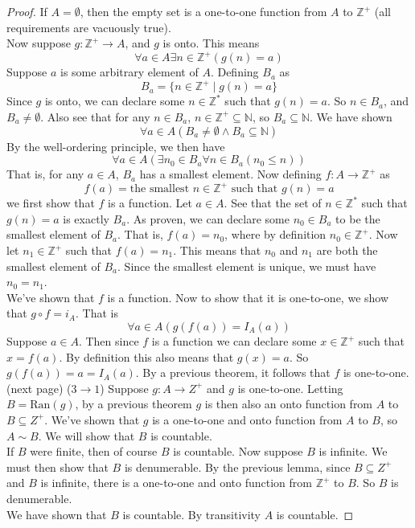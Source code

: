 \documentclass{report}
\theoremstyle{definition}
\begin{document}
\begin{proof}
If $A=\emptyset$, then the empty set is a one-to-one function from $A$ to $\mathbb Z^+$ (all requirements are vacuously true).\\
\indent Now suppose $g:\mathbb Z^+\to A$, and $g$ is onto. This means
\begin{equation*}
\forall a\in A\exists n\in\mathbb Z^+(g(n)=a)
\end{equation*}
Suppose $a$ is some arbitrary element of $A$. Defining $B_a$ as
\begin{equation*}
B_a=\{n\in\mathbb Z^+\mid g(n)=a\}
\end{equation*}
Since $g$ is onto, we can declare some $n\in\mathbb Z^*$ such that $g(n)=a$. So $n\in B_a$, and $B_a\neq\emptyset$. Also see 
that for any $n\in B_a$, $n\in\mathbb Z^+\subseteq\mathbb N$, so
$B_a\subseteq\mathbb N$. We have shown
\begin{equation*}
\forall a\in A(B_a\neq\emptyset\land B_a\subseteq\mathbb N)
\end{equation*}
By the well-ordering principle, we then have
\begin{equation*}
\forall a\in A(\exists n_0\in B_a\forall n\in B_a(n_0\leq n))
\end{equation*}
That is, for any $a\in A$, $B_a$ has a smallest element. Now defining $f:A\to\mathbb Z^+$ as
\begin{equation*}
f(a)=\text{the smallest }n\in\mathbb Z^+\text{ such that }g(n)=a
\end{equation*}
we first show that $f$ is a function. Let $a\in A$. See that the set of $n\in\mathbb Z^*$ such that $g(n)=a$ is exactly $B_a$.
As proven, we can declare some $n_0\in B_a$ to be the smallest element of $B_a$. That is, $f(a)=n_0$, where by definition $n_0\in\mathbb Z^+$. 
Now let $n_1\in\mathbb Z^+$ such that $f(a)=n_1$.
This means that $n_0$ and $n_1$ are both the smallest element of
$B_a$. Since the smallest element is unique, we must have $n_0=n_1$.\\
\indent We've shown that $f$ is a function. Now to show that it is one-to-one, we show that $g\circ f=i_A$. That is
\begin{equation*}
\forall a\in A(g(f(a))=I_A(a))
\end{equation*}
Suppose $a\in A$. Then since $f$ is a function we can declare some $x\in\mathbb Z^+$ such that $x=f(a)$. By definition this also
means that $g(x)=a$. So $g(f(a))=a=I_A(a)$.
By a previous theorem, it follows that $f$ is one-to-one.\\
(next page)\newpage
\noindent($3\rightarrow1$)
Suppose $g:A\to Z^+$ and $g$ is one-to-one. Letting $B=\text{Ran}(g)$, by a previous theorem $g$ is then also an onto function 
from $A$ to $B\subseteq Z^+$. We've shown that $g$ is a one-to-one and onto function from $A$ to $B$, so $A\sim B$. We will
show that $B$ is countable.\\
\indent If $B$ were finite, then of course $B$ is countable. Now suppose $B$ is infinite. We must then show that $B$ is denumerable. 
By the previous lemma, since $B\subseteq Z^+$ and $B$ is infinite, there is a one-to-one and onto function from $\mathbb Z^+$ to $B$.
So $B$ is denumerable.\\
\indent We have shown that $B$ is countable. By transitivity $A$ is countable.
\end{proof}
\end{document}
